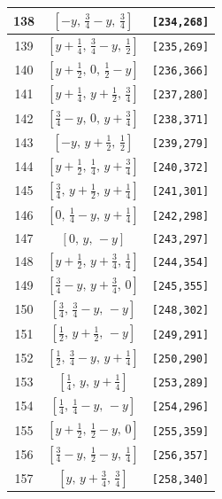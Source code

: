\documentclass[fleqn,8pt]{jsarticle}
\begin{document}
\begin{longtable}{ccc}
138 & $\left[ - y,\, \frac{3}{4} - y,\, \frac{3}{4} \right]$ & {\tt [234,268]} \\ \hline
139 & $\left[ y + \frac{1}{4},\, \frac{3}{4} - y,\, \frac{1}{2} \right]$ & {\tt [235,269]} \\ \hline
140 & $\left[ y + \frac{1}{2},\, 0,\, \frac{1}{2} - y \right]$ & {\tt [236,366]} \\ \hline
141 & $\left[ y + \frac{1}{4},\, y + \frac{1}{2},\, \frac{3}{4} \right]$ & {\tt [237,280]} \\ \hline
142 & $\left[ \frac{3}{4} - y,\, 0,\, y + \frac{3}{4} \right]$ & {\tt [238,371]} \\ \hline
143 & $\left[ - y,\, y + \frac{1}{2},\, \frac{1}{2} \right]$ & {\tt [239,279]} \\ \hline
144 & $\left[ y + \frac{1}{2},\, \frac{1}{4},\, y + \frac{3}{4} \right]$ & {\tt [240,372]} \\ \hline
145 & $\left[ \frac{3}{4},\, y + \frac{1}{2},\, y + \frac{1}{4} \right]$ & {\tt [241,301]} \\ \hline
146 & $\left[ 0,\, \frac{1}{4} - y,\, y + \frac{1}{4} \right]$ & {\tt [242,298]} \\ \hline
147 & $\left[ 0,\, y,\, - y \right]$ & {\tt [243,297]} \\ \hline
148 & $\left[ y + \frac{1}{2},\, y + \frac{3}{4},\, \frac{1}{4} \right]$ & {\tt [244,354]} \\ \hline
149 & $\left[ \frac{3}{4} - y,\, y + \frac{3}{4},\, 0 \right]$ & {\tt [245,355]} \\ \hline
150 & $\left[ \frac{3}{4},\, \frac{3}{4} - y,\, - y \right]$ & {\tt [248,302]} \\ \hline
151 & $\left[ \frac{1}{2},\, y + \frac{1}{2},\, - y \right]$ & {\tt [249,291]} \\ \hline
152 & $\left[ \frac{1}{2},\, \frac{3}{4} - y,\, y + \frac{1}{4} \right]$ & {\tt [250,290]} \\ \hline
153 & $\left[ \frac{1}{4},\, y,\, y + \frac{1}{4} \right]$ & {\tt [253,289]} \\ \hline
154 & $\left[ \frac{1}{4},\, \frac{1}{4} - y,\, - y \right]$ & {\tt [254,296]} \\ \hline
155 & $\left[ y + \frac{1}{2},\, \frac{1}{2} - y,\, 0 \right]$ & {\tt [255,359]} \\ \hline
156 & $\left[ \frac{3}{4} - y,\, \frac{1}{2} - y,\, \frac{1}{4} \right]$ & {\tt [256,357]} \\ \hline
157 & $\left[ y,\, y + \frac{3}{4},\, \frac{3}{4} \right]$ & {\tt [258,340]} \\ \hline

\end{longtable}
\end{document}
